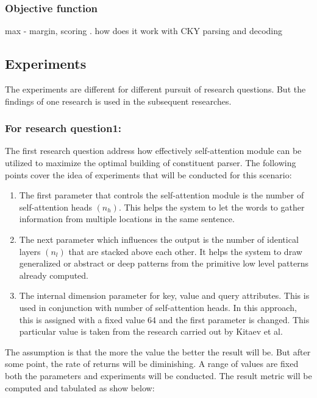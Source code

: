 \documentclass[a4paper, 11pt]{article}
\begin{document}
\subsubsection{Objective function}
max - margin, scoring . how does it work with CKY parsing and decoding

\subsection{Experiments}

The experiments are different for different pursuit of research questions. But the findings of one research is used in the subsequent researches. 

\subsubsection{For research question1:}
The first research question address how effectively self-attention module can be utilized to maximize the optimal building of constituent parser. The following points cover the idea of experiments that will be conducted for this scenario:
\begin{enumerate}
\item The first parameter that controls the self-attention module is the number of self-attention heads $(n_h)$. This helps the system to let the words to gather information from multiple locations in the same sentence. 
\item The next parameter which influences the output is the number of identical layers $(n_l)$ that are stacked above each other. It helps the system to draw generalized or abstract or deep patterns from the primitive low level patterns already computed. 
\item The internal dimension parameter for key, value and query attributes. This is used in conjunction with number of self-attention heads. In this approach, this is assigned with a fixed value 64 and the first parameter is changed. This particular value is taken from the research carried out by Kitaev et al. \parencite*{Kitaev2019}
\end{enumerate}

The assumption is that the more the value the better the result will be. But after some point, the rate of returns will be diminishing. A range of values are fixed both the parameters and experiments will be conducted. The result metric will be computed and tabulated as show below:
\end{document}
